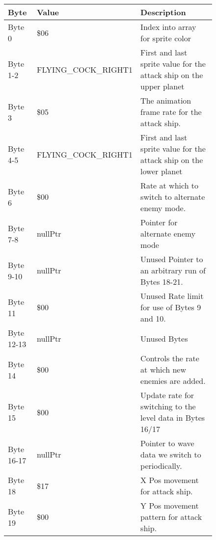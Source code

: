 \begin{figure}[H]
  {
  \setlength{\tabcolsep}{3.0pt}
  \setlength\cmidrulewidth{\heavyrulewidth} %
  \begin{adjustbox}{width=12cm}

\begin{tabular}{lll}
\toprule
 Byte       & Value                      & Description                                                         \\
\midrule
 Byte 0     & \$06                        & Index into array for sprite color                                   \\
 Byte 1-2   & FLYING\_COCK\_RIGHT1         & First and last sprite value for the attack ship on the upper planet \\
 Byte 3     & \$05                        & The animation frame rate for the attack ship.                       \\
 Byte 4-5   & FLYING\_COCK\_RIGHT1         & First and last sprite value for the attack ship on the lower planet \\
 Byte 6     & \$00                        & Rate at which to switch to alternate enemy mode.                    \\
 Byte 7-8   & nullPtr                    & Pointer for alternate enemy mode                                    \\
 Byte 9-10  & nullPtr                    & Unused Pointer to an arbitrary run of Bytes 18-21.                  \\
 Byte 11    & \$00                        & Unused Rate limit for use of Bytes 9 and 10.                        \\
 Byte 12-13 & nullPtr                    & Unused Bytes                                                        \\
 Byte 14    & \$00                        & Controls the rate at which new enemies are added.                   \\
 Byte 15    & \$00                        & Update rate for switching to the level data in Bytes 16/17          \\
 Byte 16-17 & nullPtr                    & Pointer to wave data we switch to periodically.                     \\
 Byte 18    & \$17                        & X Pos movement for attack ship.                                     \\
 Byte 19    & \$00                        & Y Pos movement pattern for attack ship.                             \\

\end{tabular}
\end{adjustbox}}
\end{figure}
